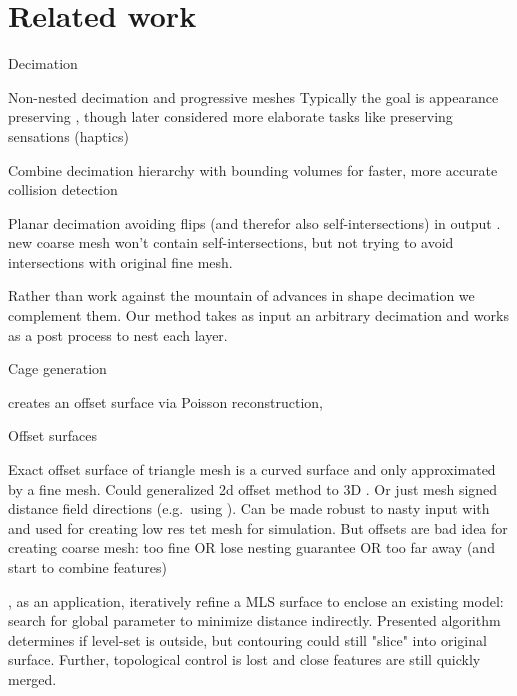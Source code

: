 \section{Related work}
\label{sec:related}

Decimation

Non-nested decimation \cite{Garland:1997:SSU} and progressive meshes
\cite{Hoppe:1996:PM} \cite{Melax98} Typically the goal is appearance preserving
\cite{Cohen:1998:AS}, though later considered more elaborate tasks like
preserving sensations (haptics) \cite{Otaduy:2003:SPS}

Combine decimation hierarchy with bounding volumes for faster, more accurate
collision detection
\cite{Otaduy:2003:CDH} 

Planar decimation avoiding flips (and therefor also self-intersections) in
output \cite{AnderssonGL09}.  \cite{gumhold2003intersection} new coarse mesh
won't contain self-intersections, but not trying to avoid intersections with
original fine mesh.

Rather than work against the mountain of advances in shape decimation we
complement them. Our method takes as input an arbitrary decimation and works as
a post process to nest each layer.

Cage generation

\cite{Ben-Chen:2009:SDT} creates an offset surface via Poisson reconstruction,

\cite{Deng:2011vr,Xian:2012tv}

Offset surfaces 

\cite{Campen:2010} Exact offset surface of triangle mesh is a curved surface
and only approximated by a fine mesh.  Could generalized 2d offset method
\cite{chen2005polygon} to 3D \cite{Jacobson:WN:2013}.  Or just mesh signed
distance field directions (e.g.\ using \cite{cgal}). Can be made robust to
nasty input with \cite{Xu:2014:SDF} and used for creating low res tet mesh for
simulation.
%
But offsets are bad idea for creating coarse mesh: too fine OR lose nesting
guarantee OR too far away (and start to combine features)

\cite{Shen:2004:IAI}, as an application, iteratively refine a MLS surface to
enclose an existing model: search for global parameter to minimize distance
indirectly. Presented algorithm determines if level-set is outside, but
contouring could still "slice" into original surface.  Further, topological
control is lost and close features are still quickly merged. 

